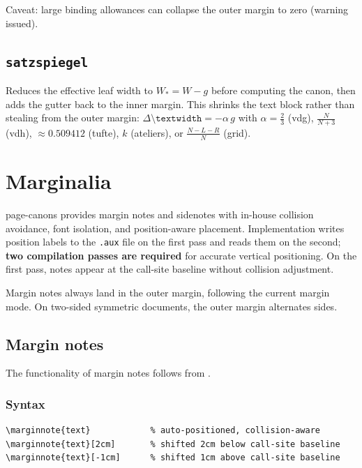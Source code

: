 \documentclass[11pt, twoside, openany]{book}
\newcommand{\pkg}[1]{\textsf{#1}}
\newcommand{\cmd}[1]{\texttt{\textbackslash #1}}
\begin{document}
Caveat: large binding allowances can collapse the outer margin to zero (warning issued).

\section{\texttt{satzspiegel}}\label{sec:guttersatzspiegel}

Reduces the effective leaf width to $W_\ast = W - g$ before computing the canon, then adds the gutter back to the inner margin. This shrinks the text block rather than stealing from the outer margin: $\Delta\cmd{textwidth} = -\alpha\,g$ with $\alpha = \tfrac{2}{3}$ (vdg), $\tfrac{N}{N+3}$ (vdh), $\approx 0.509412$ (tufte), $k$ (ateliers), or $\tfrac{N-L-R}{N}$ (grid).


\chapter{Marginalia}\label{chapter:marginalia}

\pkg{page-canons} provides margin notes and sidenotes with in-house collision avoidance, font isolation, and position-aware placement. Implementation writes position labels to the \texttt{.aux} file on the first pass and reads them on the second; \textbf{two compilation passes are required} for accurate vertical positioning. On the first pass, notes appear at the call-site baseline without collision adjustment.

Margin notes always land in the outer margin, following the current margin mode. On two-sided symmetric documents, the outer margin alternates sides.

\section{Margin notes}\label{sec:marginnotes}

The functionality of margin notes follows from \cite{marginnote}.

\subsection{Syntax}\label{subsec:marginnotessyntax}

\begin{verbatim}
\marginnote{text}            % auto-positioned, collision-aware
\marginnote{text}[2cm]       % shifted 2cm below call-site baseline
\marginnote{text}[-1cm]      % shifted 1cm above call-site baseline
\end{verbatim}
\end{document}
